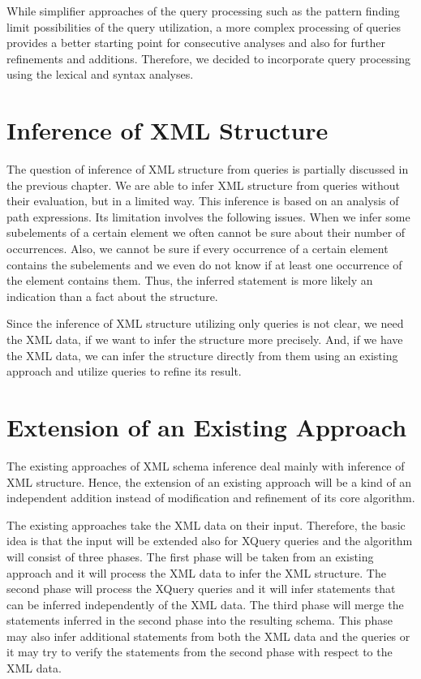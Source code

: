 While simplifier approaches of the query processing such as the pattern finding limit possibilities of the query utilization, a more complex processing of queries provides a better starting point for consecutive analyses and also for further refinements and additions. Therefore, we decided to incorporate query processing using the lexical and syntax analyses.

\section{Inference of XML Structure}
The question of inference of XML structure from queries is partially discussed in the previous chapter. We are able to infer XML structure from queries without their evaluation, but in a limited way. This inference is based on an analysis of path expressions. Its limitation involves the following issues. When we infer some subelements of a certain element we often cannot be sure about their number of occurrences. Also, we cannot be sure if every occurrence of a certain element contains the subelements and we even do not know if at least one occurrence of the element contains them. Thus, the inferred statement is more likely an indication than a fact about the structure.

Since the inference of XML structure utilizing only queries is not clear, we need the XML data, if we want to infer the structure more precisely. And, if we have the XML data, we can infer the structure directly from them using an existing approach and utilize queries to refine its result.

\section{Extension of an Existing Approach}
The existing approaches of XML schema inference deal mainly with inference of XML structure. Hence, the extension of an existing approach will be a kind of an independent addition instead of modification and refinement of its core algorithm.

The existing approaches take the XML data on their input. Therefore, the basic idea is that the input will be extended also for XQuery queries and the algorithm will consist of three phases. The first phase will be taken from an existing approach and it will process the XML data to infer the XML structure. The second phase will process the XQuery queries and it will infer statements that can be inferred independently of the XML data. The third phase will merge the statements inferred in the second phase into the resulting schema. This phase may also infer additional statements from both the XML data and the queries or it may try to verify the statements from the second phase with respect to the XML data.

